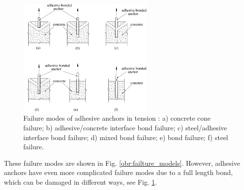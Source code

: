 \begin{figure}[h!]
	\centering
	\includegraphics[width=0.6\textwidth]{obrazky/adhesive_failture_models_repaired.png}
	\caption[Failure modes of adhesive anchors in tensile]{Failure modes of adhesive anchors in tension \cite{adhesive_anchors}: a) concrete cone failure; b) adhesive/concrete interface bond failure; c) steel/adhesive interface bond failure; d) mixed bond failure; e) bond failure; f) steel failure.}
	\label{obr:failture_adhesive_models}
\end{figure}
 
These failure modes are shown in Fig. \ref{obr:failture_models}. However, adhesive anchors have even more complicated failure modes due to a full length bond, which can be damaged in different ways, see Fig. \ref{obr:failture_adhesive_models}.
